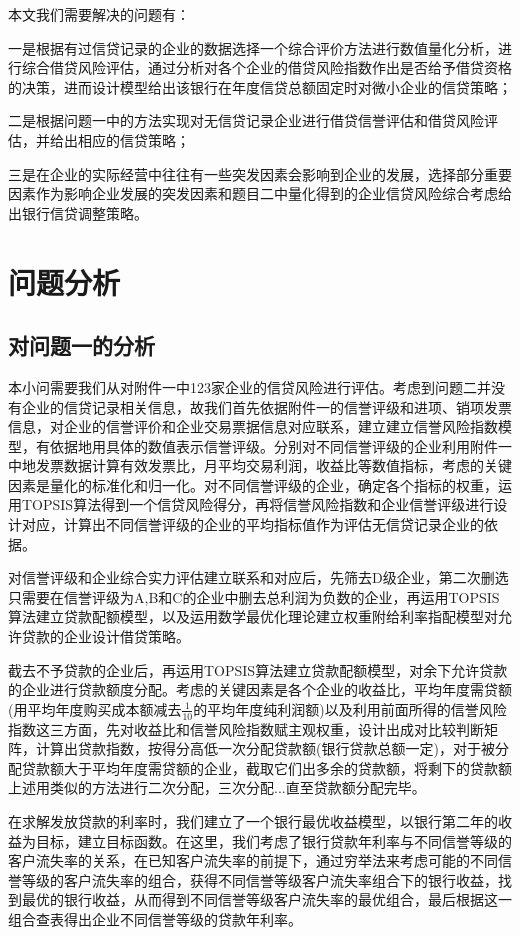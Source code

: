 \documentclass{cumcmthesis}
\begin{document}
本文我们需要解决的问题有：

一是根据有过信贷记录的企业的数据选择一个综合评价方法进行数值量化分析，进行综合借贷风险评估，通过分析对各个企业的借贷风险指数作出是否给予借贷资格的决策，进而设计模型给出该银行在年度信贷总额固定时对微小企业的信贷策略；

二是根据问题一中的方法实现对无信贷记录企业进行借贷信誉评估和借贷风险评估，并给出相应的信贷策略；

三是在企业的实际经营中往往有一些突发因素会影响到企业的发展，选择部分重要因素作为影响企业发展的突发因素和题目二中量化得到的企业信贷风险综合考虑给出银行信贷调整策略。
\section{问题分析}
\subsection{对问题一的分析}
本小问需要我们从对附件一中123家企业的信贷风险进行评估。考虑到问题二并没有企业的信贷记录相关信息，故我们首先依据附件一的信誉评级和进项、销项发票信息，对企业的信誉评价和企业交易票据信息对应联系，建立建立信誉风险指数模型，有依据地用具体的数值表示信誉评级。分别对不同信誉评级的企业利用附件一中地发票数据计算有效发票比，月平均交易利润，收益比等数值指标，考虑的关键因素是量化的标准化和归一化。对不同信誉评级的企业，确定各个指标的权重，运用TOPSIS算法得到一个信贷风险得分，再将信誉风险指数和企业信誉评级进行设计对应，计算出不同信誉评级的企业的平均指标值作为评估无信贷记录企业的依据。

对信誉评级和企业综合实力评估建立联系和对应后，先筛去D级企业，第二次删选只需要在信誉评级为A,B和C的企业中删去总利润为负数的企业，再运用TOPSIS算法建立贷款配额模型，以及运用数学最优化理论建立权重附给利率指配模型对允许贷款的企业设计借贷策略。

截去不予贷款的企业后，再运用TOPSIS算法建立贷款配额模型，对余下允许贷款的企业进行贷款额度分配。考虑的关键因素是各个企业的收益比，平均年度需贷额(用平均年度购买成本额减去$\frac{1}{10}$的平均年度纯利润额)以及利用前面所得的信誉风险指数这三方面，先对收益比和信誉风险指数赋主观权重，设计出成对比较判断矩阵，计算出贷款指数，按得分高低一次分配贷款额(银行贷款总额一定)，对于被分配贷款额大于平均年度需贷额的企业，截取它们出多余的贷款额，将剩下的贷款额上述用类似的方法进行二次分配，三次分配...直至贷款额分配完毕。

在求解发放贷款的利率时，我们建立了一个银行最优收益模型，以银行第二年的收益为目标，建立目标函数。在这里，我们考虑了银行贷款年利率与不同信誉等级的客户流失率的关系，在已知客户流失率的前提下，通过穷举法来考虑可能的不同信誉等级的客户流失率的组合，获得不同信誉等级客户流失率组合下的银行收益，找到最优的银行收益，从而得到不同信誉等级客户流失率的最优组合，最后根据这一组合查表得出企业不同信誉等级的贷款年利率。
\end{document}
